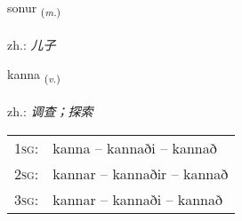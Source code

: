 \documentclass[frontgrid, backgrid]{flacards}\usepackage[]{graphicx}\usepackage[]{xcolor}
\begin{document}
\renewcommand{\blhead}{\vskip5pt {\small\bfseries\footnotesize Nafnorð | 名词 }}
\renewcommand{\bcfoot}{\vskip5pt \hspace{2pt}{\small\bfseries\footnotesize 1K}}


{sonur \small{\textsubscript{(\textit{m.})}} \\[1ex] %
\textphonetic{[sɔːnʏr]} \\
zh.: \emph{儿子} \\  [2ex]
\renewcommand*{\arraystretch}{0.8}
}

\renewcommand{\flhead}{\vskip5pt \fboxsep=0pt {\small\bfseries\footnotesize Sagnorð | 动词}}
\renewcommand{\fcfoot}{\vskip5pt \fboxsep=0pt \hspace{2pt}{\small\bfseries\footnotesize 1K}}

\renewcommand{\blhead}{\vskip5pt {\small\bfseries\footnotesize Sagnorð | 动词 }}
\renewcommand{\bcfoot}{\vskip5pt \hspace{2pt}{\small\bfseries\footnotesize 1K}}


{kanna \small{\textsubscript{(\textit{v.})}} \\[1ex] %
\textphonetic{[kʰana]} \\
zh.: \emph{调查；探索} \\  [2ex]
\renewcommand*{\arraystretch}{0.8}
\begin{tabular}{p{1cm}l}
\textsc{1sg}: & kanna -- kannaði -- kannað \\ 
\textsc{2sg}: & kannar -- kannaðir -- kannað \\ 
\textsc{3sg}: & kannar -- kannaði -- kannað \\ 
\end{tabular}
}

\renewcommand{\flhead}{\vskip5pt \fboxsep=0pt {\small\bfseries\footnotesize Nafnorð | 名词}}
\renewcommand{\fcfoot}{\vskip5pt \fboxsep=0pt \hspace{2pt}{\small\bfseries\footnotesize 1K}}
\end{document}
